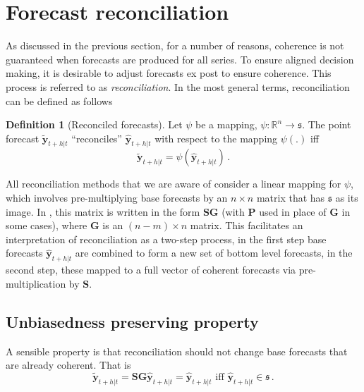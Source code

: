 \documentclass[12pt]{article}
\theoremstyle{definition}
\newtheorem{definition}{Definition}[section]
\theoremstyle{property}
\begin{document}
	
	
\section{Forecast reconciliation}\label{sec:Reconciliation}
	
	As discussed in the previous section, for a number of reasons, coherence is not guaranteed when forecasts are produced for all series.  To ensure aligned decision making, it is desirable to adjust forecasts ex post to ensure coherence.  This process is referred to as {\em reconciliation}.  In the most general terms, reconciliation can be defined as follows
	
	\begin{definition}[Reconciled forecasts]\label{def:reconpoint}
		Let $\psi$ be a mapping, $\psi:\mathbb{R}^n\rightarrow\mathfrak{s}$.  The point forecast $\tilde{\bm{y}}_{t+h|t}$ ``reconciles'' $\hat{\bm{y}}_{t+h|t}$ with respect to the mapping $\psi(.)$ iff
		\begin{equation}
		\tilde{\bm{y}}_{t+h|t}=\psi\left(\hat{\bm{y}}_{t+h|t}\right)\,.
		\end{equation}
	\end{definition}
	
	All reconciliation methods that we are aware of consider a linear mapping for $\psi$, which involves pre-multiplying base forecasts by an $n\times n$ matrix that has $\mathfrak{s}$ as its image.  In , this matrix is written in the form $\bm{SG}$ (with $\bm{P}$ used in place of $\bm{G}$ in some cases), where $\bm{G}$ is an $(n-m)\times n$ matrix.  This facilitates an interpretation of reconciliation as a two-step process, in the first step base forecasts $\hat{\bm{y}}_{t+h|t}$ are combined to form a new set of bottom level forecasts, in the second step, these mapped to a full vector of coherent forecasts via pre-multiplication by $\bm{S}$.  
	
	\subsection{Unbiasedness preserving property}
	
	A sensible property is that reconciliation should not change base forecasts that are already coherent.  That is 
	\begin{equation}	
	\label{eq:propcohnochange}
	\tilde{\bm{y}}_{t+h|t}=\bm{SG}\hat{\bm{y}}_{t+h|t}=\hat{\bm{y}}_{t+h|t}\mbox{ iff }
	\hat{\bm{y}}_{t+h|t}\in\mathfrak{s}\,.
	\end{equation}
	
\end{document}
